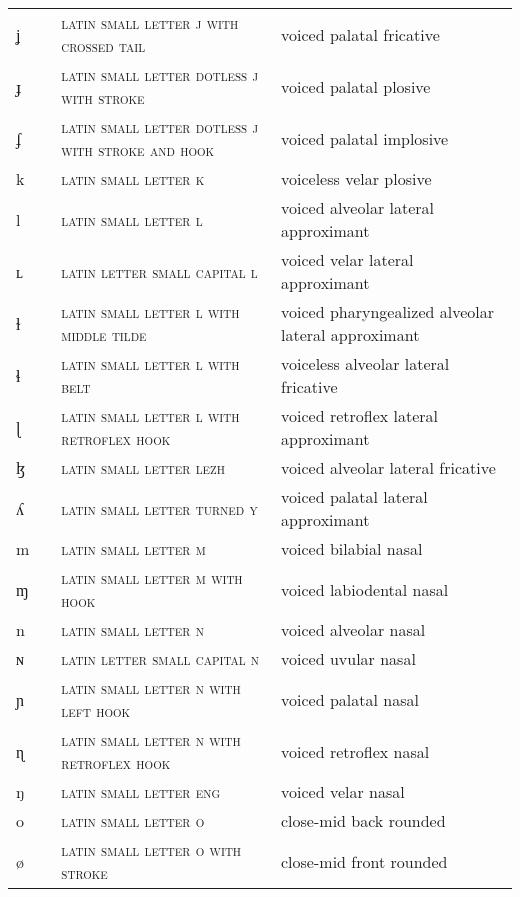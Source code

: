 \begin{center}
\begin{xtabular}{ l l L{4.5cm} L{4.5cm} }
ʝ &  & \textsc{latin small letter j with crossed tail} & voiced palatal fricative \\ 
ɟ &  & \textsc{latin small letter dotless j with stroke} & voiced palatal plosive \\ 
ʄ &  & \textsc{latin small letter dotless j with stroke and hook} & voiced palatal implosive \\ 
k &  & \textsc{latin small letter k} & voiceless velar plosive \\ 
l &  & \textsc{latin small letter l} & voiced alveolar lateral approximant \\ 
ʟ &  & \textsc{latin letter small capital l} & voiced velar lateral approximant \\ 
ɫ &  & \textsc{latin small letter l with middle tilde} & voiced pharyngealized alveolar lateral approximant \\ 
ɬ &  & \textsc{latin small letter l with belt} & voiceless alveolar lateral fricative \\ 
ɭ &  & \textsc{latin small letter l with retroflex hook} & voiced retroflex lateral approximant \\ 
ɮ &  & \textsc{latin small letter lezh} & voiced alveolar lateral fricative \\ 
ʎ &  & \textsc{latin small letter turned y} & voiced palatal lateral approximant \\ 
m &  & \textsc{latin small letter m} & voiced bilabial nasal \\ 
ɱ &  & \textsc{latin small letter m with hook} & voiced labiodental nasal \\ 
n &  & \textsc{latin small letter n} & voiced alveolar nasal \\ 
ɴ &  & \textsc{latin letter small capital n} & voiced uvular nasal \\ 
ɲ &  & \textsc{latin small letter n with left hook} & voiced palatal nasal \\ 
ɳ &  & \textsc{latin small letter n with retroflex hook} & voiced retroflex nasal \\ 
ŋ &  & \textsc{latin small letter eng} & voiced velar nasal \\ 
o &  & \textsc{latin small letter o} & close-mid back rounded \\ 
ø &  & \textsc{latin small letter o with stroke} & close-mid front rounded \\ 

\end{xtabular}
\end{center}

